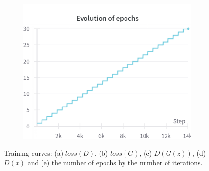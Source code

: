 \begin{figure}[H]
    \begin{subfigure}{0.45\textwidth}
        \centering
        \includegraphics[width=0.95\linewidth]{cDCGAN/epochs.png}
        \caption{}
        \label{subfig:cDCGAN/epochs}
    \end{subfigure}%

    \caption{Training curves: (a) $loss(D)$, (b) $loss(G)$, (c) $D(G(z))$, (d) $D(x)$ and (e) the number of epochs by the number of iterations.}
    \label{fig:cDCGAN_curves}
\end{figure}
